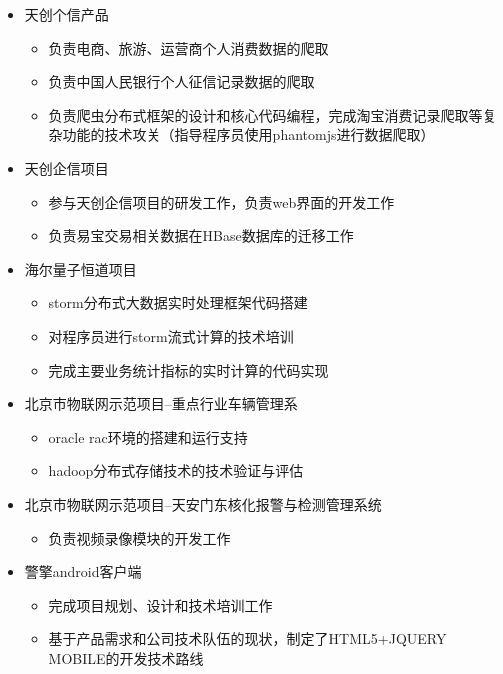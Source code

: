 \documentclass{resume}
\begin{document}
\begin{itemize}
  \item 天创个信产品
  \begin{itemize}
    \item 负责电商、旅游、运营商个人消费数据的爬取
    \item 负责中国人民银行个人征信记录数据的爬取
    \item 负责爬虫分布式框架的设计和核心代码编程，完成淘宝消费记录爬取等复杂功能的技术攻关（指导程序员使用phantomjs进行数据爬取）
  \end{itemize}
  \item 天创企信项目
  \begin{itemize}
    \item 参与天创企信项目的研发工作，负责web界面的开发工作
    \item 负责易宝交易相关数据在HBase数据库的迁移工作
  \end{itemize}
\end{itemize}

\begin{itemize}
  \item 海尔量子恒道项目
  \begin{itemize}
    \item storm分布式大数据实时处理框架代码搭建
    \item 对程序员进行storm流式计算的技术培训
    \item 完成主要业务统计指标的实时计算的代码实现
  \end{itemize}
\end{itemize}

\begin{itemize}
  \item 北京市物联网示范项目--重点行业车辆管理系
  \begin{itemize}
    \item oracle rac环境的搭建和运行支持
    \item hadoop分布式存储技术的技术验证与评估
  \end{itemize}
  \item 北京市物联网示范项目--天安门东核化报警与检测管理系统
  \begin{itemize}
    \item 负责视频录像模块的开发工作
  \end{itemize}
  \item 警擎android客户端
  \begin{itemize}
    \item 完成项目规划、设计和技术培训工作
    \item 基于产品需求和公司技术队伍的现状，制定了HTML5+JQUERY MOBILE的开发技术路线
  \end{itemize}
\end{itemize}
\end{document}

